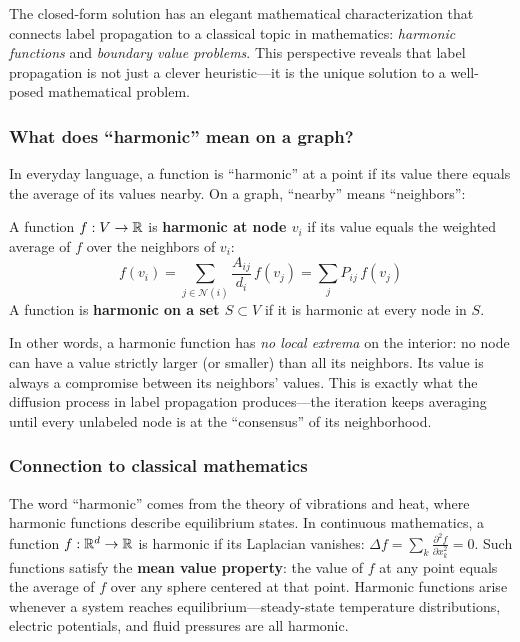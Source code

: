 \begin{notechapter}
The closed-form solution has an elegant mathematical characterization that
connects label propagation to a classical topic in mathematics:
\emph{harmonic functions} and \emph{boundary value problems}. This
perspective reveals that label propagation is not just a clever heuristic---it
is the unique solution to a well-posed mathematical problem.

\subsubsection*{What does ``harmonic'' mean on a graph?}

In everyday language, a function is ``harmonic'' at a point if its value there
equals the average of its values nearby. On a graph, ``nearby'' means
``neighbors'':

\begin{definition}
\label{semi-supervised-graphs:def:harmonic}
A function $f: V \to \mathbb{R}$ is \textbf{harmonic at node $v_i$} if its value
equals the weighted average of $f$ over the neighbors of $v_i$:
\begin{equation}
\label{semi-supervised-graphs:eq:harmonic_condition}
f(v_i) = \sum_{j \in \mathcal{N}(i)} \frac{A_{ij}}{d_i}\,f(v_j)
= \sum_j P_{ij}\,f(v_j)
\end{equation}
A function is \textbf{harmonic on a set $S \subset V$} if it is harmonic at
every node in $S$.
\end{definition}

In other words, a harmonic function has \emph{no local extrema} on the
interior: no node can have a value strictly larger (or smaller) than all its
neighbors. Its value is always a compromise between its neighbors' values.
This is exactly what the diffusion process in label propagation produces---the
iteration keeps averaging until every unlabeled node is at the ``consensus''
of its neighborhood.

\subsubsection*{Connection to classical mathematics}

The word ``harmonic'' comes from the theory of vibrations and heat, where
harmonic functions describe equilibrium states. In continuous mathematics,
a function $f : \mathbb{R}^d \to \mathbb{R}$ is harmonic if its Laplacian vanishes:
$\Delta f = \sum_k \frac{\partial^2 f}{\partial x_k^2} = 0$. Such functions
satisfy the \textbf{mean value property}: the value of $f$ at any point
equals the average of $f$ over any sphere centered at that point. Harmonic
functions arise whenever a system reaches equilibrium---steady-state
temperature distributions, electric potentials, and fluid pressures are all
harmonic.


\end{notechapter}

